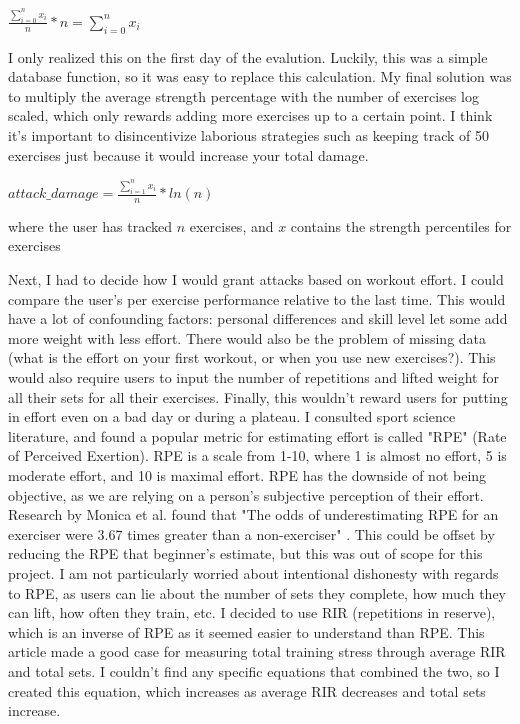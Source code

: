 \documentclass{l4proj}
\begin{document}
\begin{algorithm}[H]
  $\frac{\sum_{i=0}^{n} x_i}{n} * n = {\sum_{i=0}^{n} x_i}$
\end{algorithm}

I only realized this on the first day of the evalution. Luckily, this was a simple database function, so it was easy to replace this calculation. My final solution was to multiply the average strength percentage with the number of exercises log scaled, which only rewards adding more exercises up to a certain point. I think it's important to disincentivize laborious strategies such as keeping track of 50 exercises just because it would increase your total damage. 

\begin{algorithm}
  $attack\_damage = \frac{\sum_{i=1}^{n} x_i}{n} * ln(n) $

  where the user has tracked $n$ exercises, and $x$ contains the strength percentiles for exercises 
\end{algorithm}

Next, I had to decide how I would grant attacks based on workout effort. I could compare the user's per exercise performance relative to the last time. This would have a lot of confounding factors: personal differences and skill level let some add more weight with less effort. There would also be the problem of missing data (what is the effort on your first workout, or when you use new exercises?). This would also require users to input the number of repetitions and lifted weight for all their sets for all their exercises. Finally, this wouldn't reward users for putting in effort even on a bad day or during a plateau. I consulted sport science literature, and found a popular metric for estimating effort is called "RPE" (Rate of Perceived Exertion). RPE is a scale from 1-10, where 1 is almost no effort, 5 is moderate effort, and 10 is maximal effort. RPE has the downside of not being objective, as we are relying on a person's subjective perception of their effort. Research by Monica et al. found that "The odds of underestimating RPE for an exerciser were 3.67 times greater than a non-exerciser" \cite{RPE_estimations}. This could be offset by reducing the RPE that beginner's estimate, but this was out of scope for this project. I am not particularly worried about intentional dishonesty with regards to RPE, as users can lie about the number of sets they complete, how much they can lift, how often they train, etc. I decided to use RIR (repetitions in reserve), which is an inverse of RPE as it seemed easier to understand than RPE. This article \cite{rir} made a good case for measuring total training stress through average RIR and total sets. I couldn't find any specific equations that combined the two, so I created this equation, which increases as average RIR decreases and total sets increase.
\end{document}
